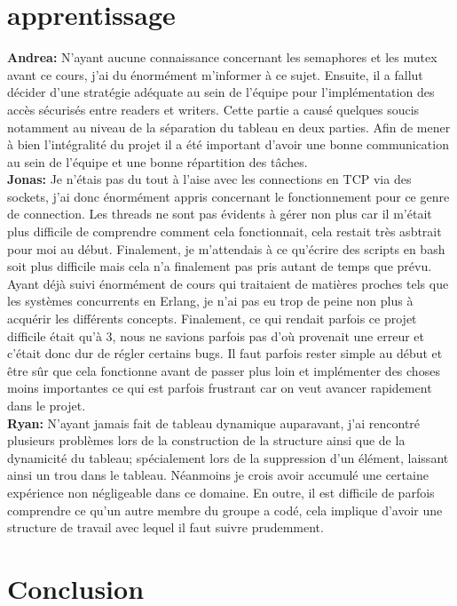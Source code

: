 \documentclass[11pt,a4paper]{article}
\begin{document}
\section{apprentissage}
\textbf{Andrea:} N'ayant aucune connaissance concernant les semaphores et les mutex avant ce cours, j'ai du énormément m'informer à ce sujet. Ensuite, il a fallut décider d'une stratégie adéquate au sein de l'équipe pour l'implémentation des accès sécurisés entre readers et writers. Cette partie a causé quelques soucis notamment au niveau de la séparation du tableau en deux parties. Afin de mener à bien l'intégralité du projet il a été important d'avoir une bonne communication au sein de l'équipe et une bonne répartition des tâches.\\
\textbf{Jonas:} Je n'étais pas du tout à l'aise avec les connections en TCP via des sockets, j'ai donc énormément appris concernant le fonctionnement pour ce genre de connection. Les threads ne sont pas évidents à gérer non plus car il m'était plus difficile de comprendre comment cela fonctionnait, cela restait très asbtrait pour moi au début. Finalement, je m'attendais à ce qu'écrire des scripts en bash soit plus difficile mais cela n'a finalement pas pris autant de temps que prévu. Ayant déjà suivi énormément de cours qui traitaient de matières proches tels que les systèmes concurrents en Erlang, je n'ai pas eu trop de peine non plus à acquérir les différents concepts. Finalement, ce qui rendait parfois ce projet difficile était qu'à 3, nous ne savions parfois pas d'où provenait une erreur et c'était donc dur de régler certains bugs. Il faut parfois rester simple au début et être sûr que cela fonctionne avant de passer plus loin et implémenter des choses moins importantes ce qui est parfois frustrant car on veut avancer rapidement dans le projet.\\
\textbf{Ryan:} N'ayant jamais fait de tableau dynamique auparavant, j'ai rencontré plusieurs problèmes lors de la construction de la structure ainsi que de la dynamicité du tableau; spécialement lors de la suppression d'un élément, laissant ainsi un trou dans le tableau. Néanmoins je crois avoir accumulé une certaine expérience non négligeable dans ce domaine. En outre, il est difficile de parfois comprendre ce qu'un autre membre du groupe a codé, cela implique d'avoir une structure de travail avec lequel il faut suivre prudemment.  

\section{Conclusion}
\end{document}

